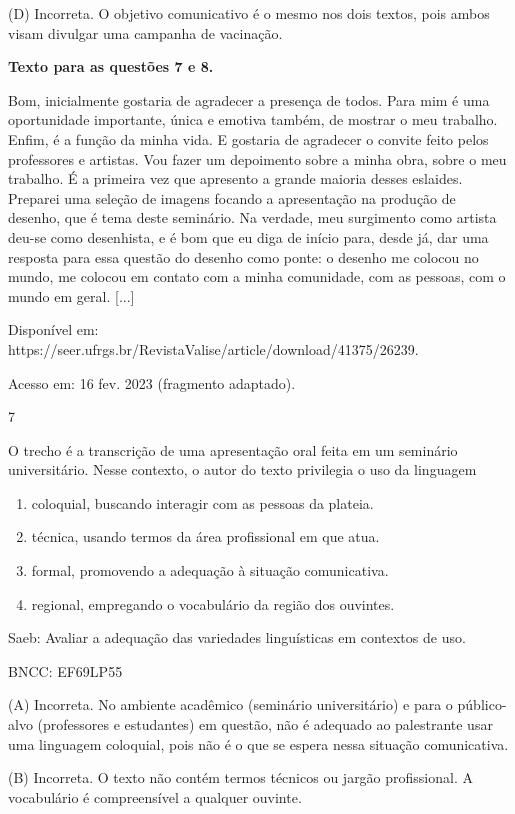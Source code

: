 (D) Incorreta. O objetivo comunicativo é o mesmo nos dois textos, pois
ambos visam divulgar uma campanha de vacinação.

\textbf{Texto para as questões 7 e 8.}

Bom, inicialmente gostaria de agradecer a presença de todos. Para mim é
uma oportunidade importante, única e emotiva também, de mostrar o meu
trabalho. Enfim, é a função da minha vida. E gostaria de agradecer o
convite feito pelos professores e artistas. Vou fazer um depoimento
sobre a minha obra, sobre o meu trabalho. É a primeira vez que apresento
a grande maioria desses eslaides. Preparei uma seleção de imagens
focando a apresentação na produção de desenho, que é tema deste
seminário. Na verdade, meu surgimento como artista deu-se como
desenhista, e é bom que eu diga de início para, desde já, dar uma
resposta para essa questão do desenho como ponte: o desenho me colocou
no mundo, me colocou em contato com a minha comunidade, com as pessoas,
com o mundo em geral. {[}...{]}

Disponível em:
https://seer.ufrgs.br/RevistaValise/article/download/41375/26239.

Acesso em: 16 fev. 2023 (fragmento adaptado).

\num{7}

O trecho é a transcrição de uma apresentação oral feita em um seminário
universitário. Nesse contexto, o autor do texto privilegia o uso da
linguagem

\begin{enumerate}
\def\labelenumi{\alph{enumi})}
\item
  coloquial, buscando interagir com as pessoas da plateia.
\item
  técnica, usando termos da área profissional em que atua.
\item
  formal, promovendo a adequação à situação comunicativa.
\item
  regional, empregando o vocabulário da região dos ouvintes.
\end{enumerate}

Saeb: Avaliar a adequação das variedades linguísticas em contextos de
uso.

BNCC: EF69LP55

(A) Incorreta. No ambiente acadêmico (seminário universitário) e para o
público-alvo (professores e estudantes) em questão, não é adequado ao
palestrante usar uma linguagem coloquial, pois não é o que se espera
nessa situação comunicativa.

(B) Incorreta. O texto não contém termos técnicos ou jargão
profissional. A vocabulário é compreensível a qualquer ouvinte.

